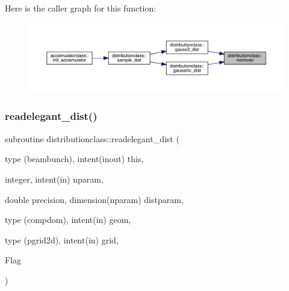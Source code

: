 Here is the caller graph for this function\+:\nopagebreak
\begin{figure}[H]
\begin{center}
\leavevmode
\includegraphics[width=350pt]{namespacedistributionclass_acfc04ca0c8be3e0f3e73779c5e88693b_icgraph}
\end{center}
\end{figure}
\mbox{\label{namespacedistributionclass_acf080fd52aac8287d955bcfd88362c07}} 
\subsubsection{\texorpdfstring{readelegant\_dist()}{readelegant\_dist()}}
{\footnotesize\ttfamily subroutine distributionclass\+::readelegant\+\_\+dist (\begin{DoxyParamCaption}\item[{type (beambunch), intent(inout)}]{this,  }\item[{integer, intent(in)}]{nparam,  }\item[{double precision, dimension(nparam)}]{distparam,  }\item[{type (compdom), intent(in)}]{geom,  }\item[{type (pgrid2d), intent(in)}]{grid,  }\item[{}]{Flag }\end{DoxyParamCaption})}

